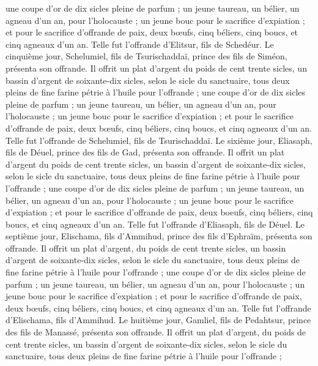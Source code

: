 \begin{multicols}{2}
une coupe d'or de dix sicles pleine de parfum ;
un jeune taureau, un bélier, un agneau d'un an, pour l'holocauste ;
un jeune bouc pour le sacrifice d’expiation ;
et pour le sacrifice d’offrande de paix, deux bœufs, cinq béliers, cinq boucs, et cinq agneaux d'un an. Telle fut l'offrande d'Elitsur, fils de Schedéur.
Le cinquième jour, Schelumiel, fils de Tsurischaddaï, prince des fils de Siméon, présenta son offrande.
Il offrit un plat d'argent du poids de cent trente sicles, un bassin d'argent de soixante-dix sicles, selon le sicle du sanctuaire, tous deux pleins de fine farine pétrie à l'huile pour l’offrande ;
une coupe d'or de dix sicles pleine de parfum ;
un jeune taureau, un bélier, un agneau d'un an, pour l'holocauste ;
un jeune bouc pour le sacrifice d’expiation ;
et pour le sacrifice d’offrande de paix, deux bœufs, cinq béliers, cinq boucs, et cinq agneaux d'un an. Telle fut l'offrande de Schelumiel, fils de Tsurischaddaï.
Le sixième jour, Eliasaph, fils de Déuel, prince des fils de Gad, présenta son offrande.
Il offrit un plat d'argent du poids de cent trente sicles, un bassin d'argent de soixante-dix sicles, selon le sicle du sanctuaire, tous deux pleins de fine farine pétrie à l'huile pour l’offrande ;
une coupe d'or de dix sicles pleine de parfum ;
un jeune taureau, un bélier, un agneau d'un an, pour l'holocauste ;
un jeune bouc pour le sacrifice d’expiation ;
et pour le sacrifice d’offrande de paix, deux boeufs, cinq béliers, cinq boucs, et cinq agneaux d'un an. Telle fut l'offrande d'Eliasaph, fils de Déuel.
Le septième jour, Elischama, fils d’Ammihud, prince des fils d'Ephraïm, présenta son offrande.
Il offrit un plat d'argent, du poids de cent trente sicles, un bassin d'argent de soixante-dix sicles, selon le sicle du sanctuaire, tous deux pleins de fine farine pétrie à l'huile pour l’offrande ;
une coupe d'or de dix sicles pleine de parfum ;
un jeune taureau, un bélier, un agneau d'un an, pour l'holocauste ;
un jeune bouc pour le sacrifice d’expiation ;
et pour le sacrifice d’offrande de paix, deux bœufs, cinq béliers, cinq boucs, et cinq agneaux d'un an. Telle fut l'offrande d'Elischama, fils d’Ammihud.
Le huitième jour, Gamliel, fils de Pedahtsur, prince des fils de Manassé, présenta son offrande.
Il offrit un plat d'argent, du poids de cent trente sicles, un bassin d'argent de soixante-dix sicles, selon le sicle du sanctuaire, tous deux pleins de fine farine pétrie à l'huile pour l’offrande ;

\end{multicols}
